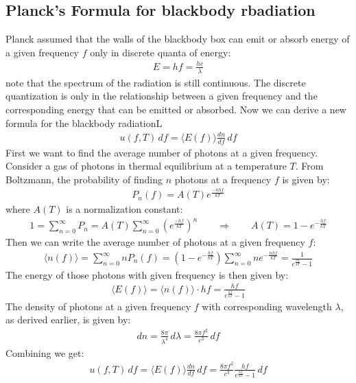 \documentclass[11pt]{article}
\theoremstyle{break}
\theoremstyle{break}
\begin{document}
\subsection{Planck's Formula for blackbody rbadiation}
Planck assumed that the walls of the blackbody box can emit or absorb energy of a given frequency $f$ only in discrete quanta of energy:
\begin{align*}
E = hf = \frac{hc}{\lambda} \tag{Planck's Relation}
\end{align*}
note that the spectrum of the radiation is still continuous. The discrete quantization is only in the relationship between a given frequency and the corresponding energy that can be emitted or absorbed. Now we can derive a new formula for the blackbody radiationL
\begin{align*}
u(f,T) \, df = \langle E(f) \rangle \frac{dn}{df}\, df
\end{align*}
First we want to find the average number of photons at a given frequency. Consider a gas of photons in thermal equilibrium at a temperature $T$. From Boltzmann, the probability of finding $n$ photons at a frequency $f$ is given by:
\begin{align*}
P_n(f) = A(T) e^{\frac{-nhf}{kT}}
\end{align*}
where $A(T)$ is a normalization constant:
\begin{align*}
1 = \sum_{n=0}^\infty P_n = A(T) \sum_{n=0}^\infty \left(e^{\frac{-hf}{kT}}\right)^n\qquad \Rightarrow\qquad A(T) = 1-e^{-\frac{hf}{kT}}
\end{align*}
Then we can write the average number of photons at a given frequency $f$:
\begin{align*}
\langle n(f) \rangle = \sum_{n=0}^\infty n P_n(f) = (1-e^{-\frac{hf}{kT}}) \sum_{n=0}^\infty n e^{-\frac{nhf}{kT}} = \frac{1}{e^{\frac{hf}{kT}}-1}
\end{align*}
The energy of those photons with given frequency is then given by:
\begin{align*}
\langle E(f) \rangle = \langle n(f) \rangle \cdot hf = \frac{hf}{e^{\frac{hf}{kT}}-1}
\end{align*}
The density of photons at a given frequency $f$ with corresponding wavelength $\lambda$, as derived earlier, is given by:
\begin{align*}
dn =\frac{8\pi}{\lambda^4}\, d\lambda = \frac{8\pi f^2}{c^3}\, df
\end{align*}
Combining we get:
\begin{align}
u(f,T) \, df = \langle E(f) \rangle \frac{dn}{df} \, df = \frac{8\pi f^2}{c^3}\frac{hf}{e^{\frac{hf}{kT}}-1}\, df \tag{UP}
\end{align}
\end{document}
